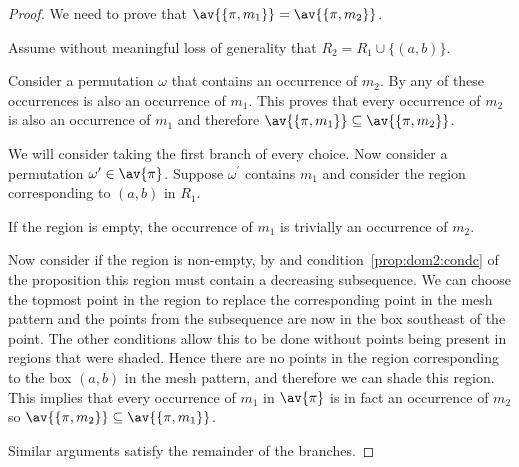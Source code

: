 \begin{proof}
    We need to prove that \(\av{\{\pi,m_1\}} = \av{\{\pi,m_2\}}\).

    \noindent Assume without meaningful loss of generality that \(R_2 = R_1 \cup \{(a,b)\}\).

    Consider a permutation \(\omega\) that contains an occurrence of \(m_2\).
    By  any of these occurrences is also an occurrence
    of \(m_1\). This proves that every occurrence of \(m_2\) is also an
    occurrence of \(m_1\) and therefore \(\av{\{\pi,m_1\}} \subseteq \av{\{\pi,m_2\}}\).

    We will consider taking the first branch of every choice.
    Now consider a permutation \(\omega^\prime \in \av{\pi}\). Suppose
    \(\omega^\prime\) contains \(m_1\) and consider the region corresponding to
    \((a,b)\) in \(R_1\).

    If the region is empty, the occurrence of \(m_1\) is trivially an occurrence
    of \(m_2\).

    Now consider if the region is non-empty, by  and
    condition~\ref{prop:dom2:condc} of the proposition this region must contain
    a decreasing subsequence.
    We can choose the topmost point in the region to replace the corresponding
    point in the mesh pattern and the points from the subsequence are now in
    the box southeast of the point. The other conditions allow this to be done
    without points being present in regions that were shaded. Hence there are no
    points in the region corresponding to the box \((a,b)\) in the mesh
    pattern, and therefore we can shade this region. This implies that every
    occurrence of \(m_1\) in \(\av{\pi}\) is in fact an occurrence of \(m_2\)
    so \(\av{\{\pi,m_2\}} \subseteq \av{\{\pi,m_1\}}\).

    Similar arguments satisfy the remainder of the branches.
\end{proof}

